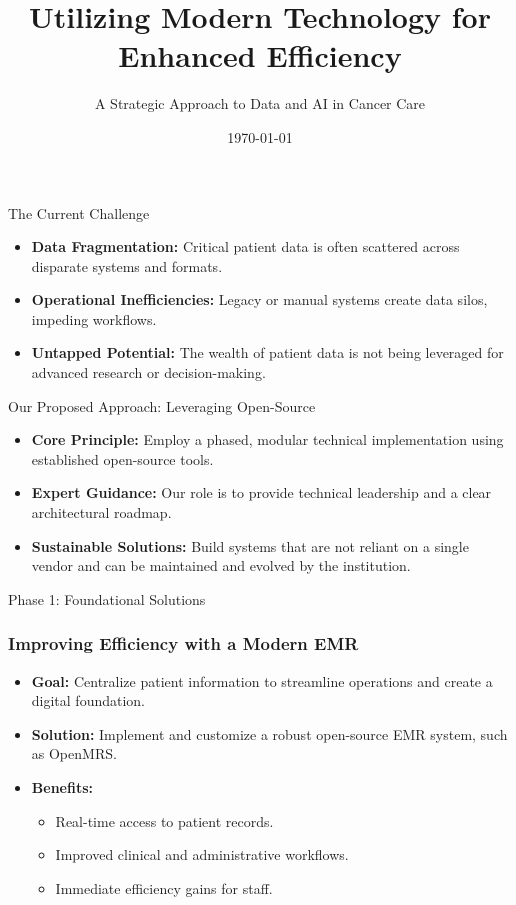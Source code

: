 \documentclass{beamer}
\title[AI for Cancer Care]{Utilizing Modern Technology for Enhanced Efficiency}
\subtitle{A Strategic Approach to Data and AI in Cancer Care}
\author{}
\date{\today}
\begin{document}
\begin{frame}
    \titlepage
\end{frame}

\begin{frame}{The Current Challenge}
    \begin{itemize}
        \item \textbf{Data Fragmentation:} Critical patient data is often scattered across disparate systems and formats.
        \item \textbf{Operational Inefficiencies:} Legacy or manual systems create data silos, impeding workflows.
        \item \textbf{Untapped Potential:} The wealth of patient data is not being leveraged for advanced research or decision-making.
    \end{itemize}
\end{frame}

\begin{frame}{Our Proposed Approach: Leveraging Open-Source}
    \begin{itemize}
        \item \textbf{Core Principle:} Employ a phased, modular technical implementation using established open-source tools.
        \item \textbf{Expert Guidance:} Our role is to provide technical leadership and a clear architectural roadmap.
        \item \textbf{Sustainable Solutions:} Build systems that are not reliant on a single vendor and can be maintained and evolved by the institution.
    \end{itemize}
\end{frame}

\begin{frame}{Phase 1: Foundational Solutions}
    \frametitle{Improving Efficiency with a Modern EMR}
    \begin{itemize}
        \item \textbf{Goal:} Centralize patient information to streamline operations and create a digital foundation.
    \item \textbf{Solution:} Implement and customize a robust open-source EMR system, such as OpenMRS.
        \item \textbf{Benefits:}
        \begin{itemize}
            \item Real-time access to patient records.
            \item Improved clinical and administrative workflows.
            \item Immediate efficiency gains for staff.
        \end{itemize}
    \end{itemize}
\end{frame}
\end{document}
